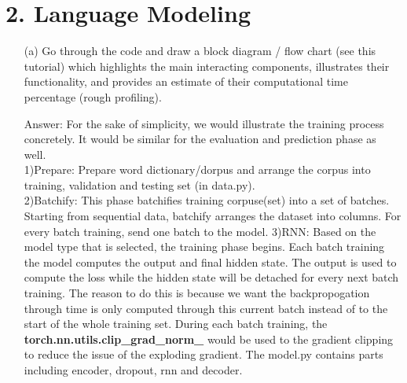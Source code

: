 \documentclass[12pt,letterpaper]{article}
\begin{document}
\section*{2. Language Modeling}
\begin{itemize}
    \item[(a)]Go through the code and draw a block diagram / flow chart (see this tutorial) which highlights the main interacting components, illustrates their functionality, and provides an estimate of their computational time percentage (rough profiling).
    
    Answer: 
    For the sake of simplicity, we would illustrate the training process concretely. It would be similar for the evaluation and prediction phase as well.\\
    1)Prepare: Prepare word dictionary/dorpus and arrange the corpus into training, validation and testing set (in data.py).\\
    2)Batchify: This phase batchifies training corpuse(set) into a set of batches. Starting from sequential data, batchify arranges the dataset into columns. For every batch training, send one batch to the model.
    3)RNN: Based on the model type that is selected, the training phase begins. Each batch training the model computes the output and final hidden state. The output is used to compute the loss while the hidden state will be detached for every next batch training. The reason to do this is because we want the backpropogation through time is only computed through this current batch instead of to the start of the whole training set. During each batch training, the \textbf{torch.nn.utils.clip\_grad\_norm\_} would be used to the gradient clipping to reduce the issue of the exploding gradient. The model.py contains parts including encoder, dropout, rnn and decoder. 
    
\end{itemize}
\end{document}

